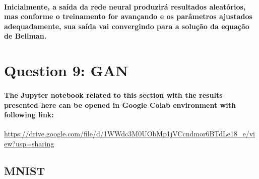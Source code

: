\documentclass[a4paper]{article}    %
\begin{document}
\paragraph{Inicialmente, a saída da rede neural produzirá resultados aleatórios, mas conforme o treinamento for avançando e os parâmetros ajustados adequadamente, sua saída vai convergindo para a solução da equação de Bellman.}


\newpage
\section{Question 9: GAN}

\paragraph{The Jupyter notebook related to this section with the results presented here can be opened in Google Colab environment with following link:\\}

\href{https://drive.google.com/file/d/1WWdc3M0UObMp1jVCcndmor6BTdLe18\_e/view?usp=sharing}{https://drive.google.com/file/d/1WWdc3M0UObMp1jVCcndmor6BTdLe18\_e/view?usp=sharing}

\subsection{MNIST}

\graphicspath{{../figures/Q9/mnist/}}
\end{document}
